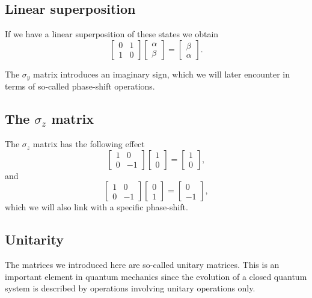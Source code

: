 \subsection{Linear superposition}
If we have a linear superposition of these states we obtain
\[
\begin{bmatrix}0 & 1 \\ 1 & 0 \end{bmatrix}\begin{bmatrix}\alpha \\ \beta \end{bmatrix}=\begin{bmatrix}\beta \\ \alpha \end{bmatrix}.
\]

The $\sigma_y$ matrix introduces an imaginary sign, which we will later encounter in terms of so-called phase-shift operations.

\subsection{The $\sigma_z$ matrix}
The $\sigma_z$ matrix has the following effect
\[
\begin{bmatrix} 1 & 0 \\ 0 & -1 \end{bmatrix}\begin{bmatrix} 1 \\ 0 \end{bmatrix}=\begin{bmatrix} 1  \\ 0  \end{bmatrix},
\]
and 
\[
\begin{bmatrix} 1 & 0 \\ 0 & -1 \end{bmatrix}\begin{bmatrix} 0 \\ 1 \end{bmatrix}=\begin{bmatrix} 0  \\ -1  \end{bmatrix},
\]
which we will also link with a specific phase-shift.

\subsection{Unitarity}

The matrices we introduced here are so-called unitary matrices. This
is an important element in quantum mechanics since the evolution of a
closed quantum system is described by operations involving unitary
operations only.

